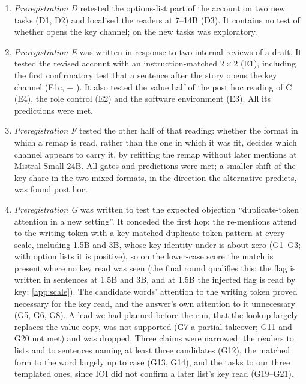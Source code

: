\begin{enumerate}
  \item \emph{Preregistration D} retested the options-list part of the account on two new tasks (D1, D2) and localised the readers at 7--14B (D3). It contains no test of whether \fmtPost{} opens the key channel; \fmtPost{} on the new tasks was exploratory.
  \item \emph{Preregistration E} was written in response to two internal reviews of a draft. It tested the revised account with an instruction-matched $2{\times}2$ (E1), including the first confirmatory test that a sentence after the story opens the key channel (E1c, \fmtPost{} $-$ \fmtSentB{}). It also tested the value half of the post hoc reading of C (E4), the role control (E2) and the software environment (E3). All its predictions were met.
  \item \emph{Preregistration F} tested the other half of that reading: whether the format in which a remap is read, rather than the one in which it was fit, decides which channel appears to carry it, by refitting the remap without later mentions at Mistral-Small-24B. All gates and predictions were met; a smaller shift of the key share in the two mixed formats, in the direction the alternative predicts, was found post hoc.
  \item \emph{Preregistration G} was written to test the expected objection ``duplicate-token attention in a new setting''. It conceded the first hop: the re-mentions attend to the writing token with a key-matched duplicate-token pattern at every scale, including 1.5B and 3B, whose key identity under \fmtPost{} is about zero (G1--G3; with option lists it is positive), so on the lower-case score the match is present where no key read was seen (the final round qualifies this: the flag is written in sentences at 1.5B and 3B, and at 1.5B the injected flag is read by key; \cref{app:scale}). The candidate words' attention to the writing token proved necessary for the key read, and the answer's own attention to it unnecessary (G5, G6, G8). A lead we had planned before the run, that the lookup largely replaces the value copy, was not supported (G7 a partial takeover; G11 and G20 not met) and was dropped. Three claims were narrowed: the readers to lists and to sentences naming at least three candidates (G12), the matched form to the word largely up to case (G13, G14), and the tasks to our three templated ones, since IOI did not confirm a later list's key read (G19--G21).

\end{enumerate}
